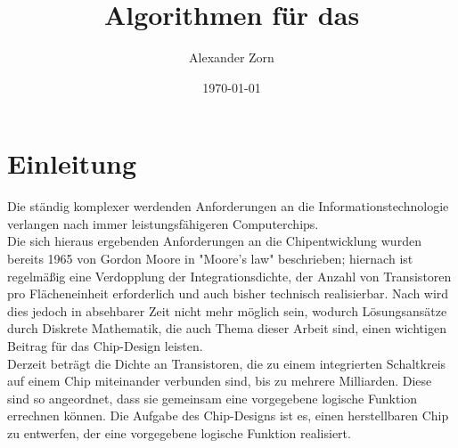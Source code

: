 \documentclass[11pt, a4paper, german]{article}
\author{Alexander Zorn}
\date{\today}
\title{Algorithmen f\"ur das \TM}
\begin{document}

\setlength{\parindent}{0pt} %
\renewcommand{\proofname}{Beweis:}
\maketitle

\setcounter{tocdepth}{2}
\tableofcontents
\newpage 
\section{Einleitung}
\label{sec:einleitung}
Die ständig komplexer werdenden Anforderungen an die Informationstechnologie verlangen nach immer leistungsfähigeren Computerchips. \\
Die sich hieraus ergebenden Anforderungen an die Chipentwicklung wurden bereits 1965 von Gordon Moore in "Moore's law"  \cite{Moore} beschrieben; hiernach ist regelmäßig eine Verdopplung der Integrationsdichte, der Anzahl von Transistoren pro Flächeneinheit erforderlich und auch bisher technisch realisierbar. Nach \cite{Khan} wird dies jedoch in absehbarer Zeit nicht mehr möglich sein, wodurch Lösungsansätze durch Diskrete Mathematik, die auch Thema dieser Arbeit sind, einen wichtigen Beitrag für das Chip-Design leisten. \\
Derzeit beträgt die Dichte an Transistoren, die zu einem integrierten Schaltkreis auf einem Chip miteinander verbunden sind, bis zu mehrere Milliarden. Diese sind so angeordnet, dass sie gemeinsam eine vorgegebene logische Funktion errechnen können. Die Aufgabe des Chip-Designs ist es, einen herstellbaren Chip zu entwerfen, der eine vorgegebene logische Funktion realisiert.\\
\end{document}
